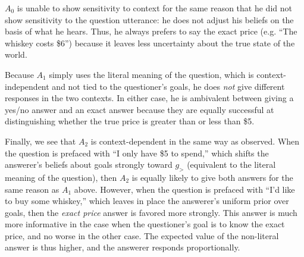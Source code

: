 \documentclass[11pt, floatsintext]{apa6}
\begin{document}
$A_0$ is unable to show sensitivity to context for the same reason that he did not show sensitivity to the question utterance: he does not adjust his beliefs on the basis of what he hears. Thus, he always prefers to say the exact price (e.g. ``The whiskey costs \$6'') because it leaves less uncertainty about the true state of the world.

Because $A_1$ simply uses the literal meaning of the question, which is context-independent and not tied to the questioner's goals, he does \emph{not} give different responses in the two contexts. In either case, he is ambivalent between giving a yes/no answer and an exact answer because they are equally successful at distinguishing whether the true price is greater than or less than \$5. 

Finally, we see that $A_2$ is context-dependent in the same way as  observed. When the question is prefaced with ``I only have \$5 to spend,'' which shifts the answerer's beliefs about goals strongly toward $g_>$ (equivalent to the literal meaning of the question), then $A_2$ is equally likely to give both answers for the same reason as $A_1$ above. However, when the question is prefaced with ``I'd like to buy some whiskey,'' which leaves in place the answerer's uniform prior over goals, then the \emph{exact price} answer is favored more strongly. This answer is much more informative in the case when the questioner's goal is to know the exact price, and no worse in the other case. The expected value of the non-literal answer is thus higher, and the answerer responds proportionally. 
\end{document}

